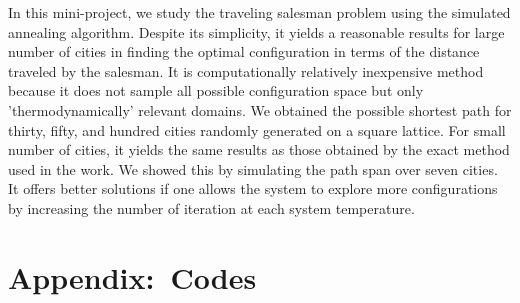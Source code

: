 \documentclass[aps,prb,twocolumn,showpacs,floatfix,superscriptaddress]{revtex4-1}
\begin{document}
In this mini-project, we study the traveling salesman problem using the simulated annealing algorithm. Despite its simplicity, it yields a reasonable results for large number of cities in finding the optimal configuration in terms of the distance traveled by the salesman. It is computationally relatively inexpensive method because it does not sample all possible configuration space but only 'thermodynamically' relevant domains. We obtained the possible shortest path for thirty, fifty, and hundred cities randomly generated on a square lattice. For small number of cities, it yields the same results as those obtained by the exact method used in the work. We showed this by simulating the path span over seven cities. It offers better solutions if one allows the system to explore more configurations by increasing the number of iteration at each system temperature.  

\section*{Appendix:~Codes}


\end{document}
